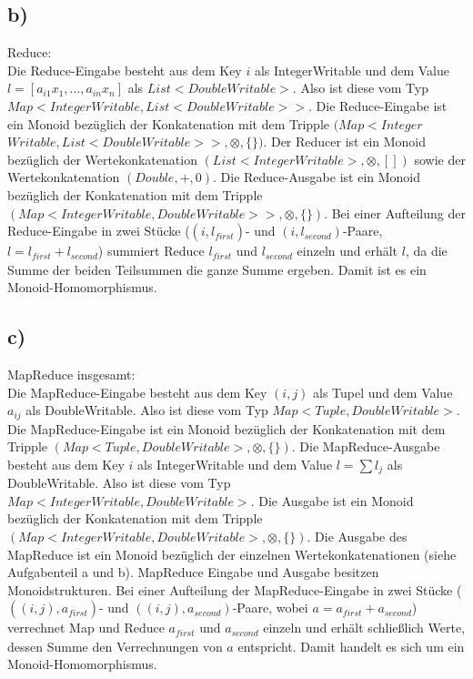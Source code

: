 \documentclass{article}
\begin{document}
\subsection*{b)}
Reduce:\\
Die Reduce-Eingabe besteht aus dem Key $i$ als IntegerWritable und dem Value $l = [a_{i1}x_{1}, ..., a_{in}x_{n}]$ als $List<DoubleWritable>$. Also ist diese vom Typ $Map<IntegerWritable, List<DoubleWritable>>$. Die Reduce-Eingabe ist ein Monoid bez\"uglich der Konkatenation mit dem Tripple $(Map<Integer$ $Writable, List<DoubleWritable>>,\otimes,\{\})$. Der Reducer ist ein Monoid bez\"uglich der Wertekonkatenation $(List<IntegerWritable>,\otimes,[])$ sowie der Wertekonkatenation $(Double, +, 0)$. Die Reduce-Ausgabe ist ein Monoid bez\"uglich der Konkatenation mit dem Tripple $(Map<IntegerWritable, DoubleWritable>>,\otimes,\{\})$. Bei einer Aufteilung der Reduce-Eingabe in zwei St\"ucke ($(i, l_{\textit{first}})$- und $(i,l_{\textit{second}})$-Paare, $l=l_{\textit{first}}+l_{\textit{second}}$) summiert Reduce $l_{\textit{first}}$ und $l_{\textit{second}}$ einzeln und erh\"alt $l$, da die Summe der beiden Teilsummen die ganze Summe ergeben. Damit ist es ein Monoid-Homomorphismus.\\

\subsection*{c)}
MapReduce insgesamt:\\
Die MapReduce-Eingabe besteht aus dem Key $(i,j)$ als Tupel und dem Value $a_{ij}$ als DoubleWritable. Also ist diese vom Typ $Map<Tuple, DoubleWritable>$. Die MapReduce-Eingabe ist ein Monoid bez\"uglich der Konkatenation mit dem Tripple $(Map<Tuple, DoubleWritable>,\otimes,\{\})$. Die MapReduce-Ausgabe besteht aus dem Key $i$ als IntegerWritable und dem Value $l = \sum l_{j}$ als DoubleWritable. Also ist diese vom Typ $Map<IntegerWritable, DoubleWritable>$. Die Ausgabe ist ein Monoid bez\"uglich der Konkatenation mit dem Tripple $(Map<IntegerWritable, DoubleWritable>,\otimes,\{\})$. Die Ausgabe des MapReduce ist ein Monoid bez\"uglich der einzelnen Wertekonkatenationen (siehe Aufgabenteil a und b). MapReduce Eingabe und Ausgabe besitzen Monoidstrukturen. Bei einer Aufteilung der MapReduce-Eingabe in zwei St\"ucke ($((i,j), a_{\textit{first}})$- und $((i,j),a_{\textit{second}})$-Paare, wobei $a=a_{\textit{first}}+a_{\textit{second}}$) verrechnet Map und Reduce $a_{\textit{first}}$ und $a_{\textit{second}}$ einzeln und erh\"alt schließlich Werte, dessen Summe den Verrechnungen von $a$ entspricht. Damit handelt es sich um ein Monoid-Homomorphismus.\\
\end{document}

